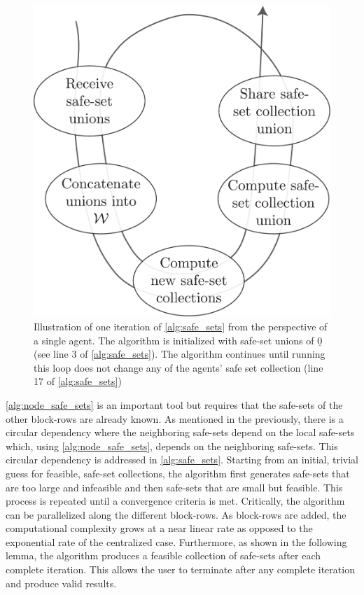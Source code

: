 \begin{figure}[t]
	\centering
	\includegraphics[width=0.75\columnwidth]{./figures/alg2_diag}
	\caption{Illustration of one iteration of \autoref{alg:safe_sets} from the perspective of a single agent. The algorithm is initialized with safe-set unions of $\underline{0}$ (see line 3 of \autoref{alg:safe_sets}). The algorithm continues until running this loop does not change any of the agents' safe set collection (line 17 of \autoref{alg:safe_sets})}
\end{figure}
\autoref{alg:node_safe_sets} is an important tool but requires that the safe-sets of the other block-rows are already known. As mentioned in the previously, there is a circular dependency where the neighboring safe-sets depend on the local safe-sets which, using \autoref{alg:node_safe_sets}, depends on the neighboring safe-sets. This circular dependency is addressed in \autoref{alg:safe_sets}. Starting from an initial, trivial guess for feasible, safe-set collections, the algorithm first generates safe-sets that are too large and infeasible and then safe-sets that are small but feasible. This process is repeated until a convergence criteria is met. Critically, the algorithm can be parallelized along the different block-rows. As block-rows are added, the computational complexity grows at a near linear rate as opposed to the exponential rate of the centralized case. Furthermore, as shown in the following lemma, the algorithm produces a feasible collection of safe-sets after each complete iteration. This allows the user to terminate after any complete iteration and produce valid results. 
